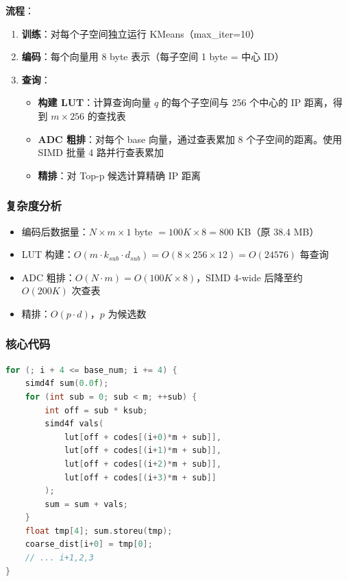 \documentclass[a4paper]{article}
\begin{document}
\textbf{流程}：
\begin{enumerate}
  \item \textbf{训练}：对每个子空间独立运行 KMeans（max\_iter=10）
  \item \textbf{编码}：每个向量用 8 byte 表示（每子空间 1 byte = 中心 ID）
  \item \textbf{查询}：
    \begin{itemize}
      \item \textbf{构建 LUT}：计算查询向量 $q$ 的每个子空间与 256 个中心的 IP 距离，得到 $m \times 256$ 的查找表
      \item \textbf{ADC 粗排}：对每个 base 向量，通过查表累加 8 个子空间的距离。使用 SIMD 批量 4 路并行查表累加
      \item \textbf{精排}：对 Top-p 候选计算精确 IP 距离
    \end{itemize}
\end{enumerate}

\subsubsection{复杂度分析}

\begin{itemize}
  \item 编码后数据量：$N \times m \times 1$ byte $= 100K \times 8 = 800$ KB（原 38.4 MB）
  \item LUT 构建：$O(m \cdot k_{sub} \cdot d_{sub}) = O(8 \times 256 \times 12) = O(24576)$ 每查询
  \item ADC 粗排：$O(N \cdot m) = O(100K \times 8)$，SIMD 4-wide 后降至约 $O(200K)$ 次查表
  \item 精排：$O(p \cdot d)$，$p$ 为候选数
\end{itemize}

\subsubsection{核心代码}

\begin{lstlisting}[language=C++, title=PQ ADC 批量 4 路 SIMD]
for (; i + 4 <= base_num; i += 4) {
    simd4f sum(0.0f);
    for (int sub = 0; sub < m; ++sub) {
        int off = sub * ksub;
        simd4f vals(
            lut[off + codes[(i+0)*m + sub]],
            lut[off + codes[(i+1)*m + sub]],
            lut[off + codes[(i+2)*m + sub]],
            lut[off + codes[(i+3)*m + sub]]
        );
        sum = sum + vals;
    }
    float tmp[4]; sum.storeu(tmp);
    coarse_dist[i+0] = tmp[0];
    // ... i+1,2,3
}
\end{lstlisting}
\end{document}
